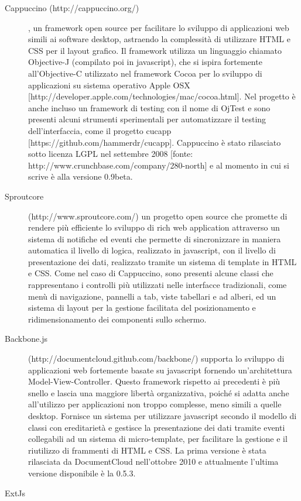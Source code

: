 \documentclass[12pt]{toptesi}
\begin{document}
\begin{description}
\item[Cappuccino (http://cappuccino.org/)], un framework open source per facilitare lo sviluppo di applicazioni web simili ai software desktop, astraendo la complessità di utilizzare HTML e CSS per il layout grafico. Il framework utilizza un linguaggio chiamato Objective-J (compilato poi in javascript), che si ispira fortemente all'Objective-C utilizzato nel framework Cocoa per lo sviluppo di applicazioni su sistema operativo Apple OSX [http://developer.apple.com/technologies/mac/cocoa.html]. Nel progetto è anche incluso un framework di testing con il nome di OjTest e sono presenti alcuni strumenti sperimentali per automatizzare il testing dell'interfaccia, come il progetto cucapp [https://github.com/hammerdr/cucapp]. Cappuccino è stato rilasciato sotto licenza LGPL nel settembre 2008 [fonte: http://www.crunchbase.com/company/280-north] e al momento in cui si scrive è alla versione 0.9beta.

\item[Sproutcore] (http://www.sproutcore.com/) un progetto open source che promette di rendere più efficiente lo sviluppo di rich web application attraverso un sistema di notifiche ed eventi che permette di sincronizzare in maniera automatica il livello di logica, realizzato in javascript, con il livello di presentazione dei dati, realizzato tramite un sistema di template in HTML e CSS. Come nel caso di Cappuccino, sono presenti alcune classi che rappresentano i controlli più utilizzati nelle interfacce tradizionali, come menù di navigazione, pannelli a tab, viste tabellari e ad alberi, ed un sistema di layout per la gestione facilitata del posizionamento e ridimensionamento dei componenti sullo schermo.

\item[Backbone.js] (http://documentcloud.github.com/backbone/) supporta lo sviluppo di applicazioni web fortemente basate su javascript fornendo un'architettura Model-View-Controller. Questo framework rispetto ai precedenti è più snello e lascia una maggiore libertà organizzativa, poiché si adatta anche all'utilizzo per applicazioni non troppo complesse, meno simili a quelle desktop. Fornisce un sistema per utilizzare javascript secondo il modello di classi con ereditarietà e gestisce la presentazione dei dati tramite eventi collegabili ad un sistema di micro-template, per facilitare la gestione e il riutilizzo di frammenti di HTML e CSS. La prima versione è stata rilasciata da DocumentCloud nell'ottobre 2010 e attualmente l'ultima versione disponibile è la 0.5.3.

\item[ExtJs] %

\end{description} 
\end{document}
